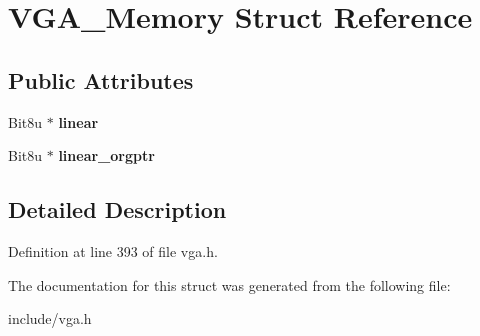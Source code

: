 \hypertarget{structVGA__Memory}{\section{V\-G\-A\-\_\-\-Memory Struct Reference}
\label{structVGA__Memory}
}
\subsection*{Public Attributes}
\begin{DoxyCompactItemize}
\item 
\hypertarget{structVGA__Memory_ad97ba657c0183be121936eeb11436171}{Bit8u $\ast$ {\bfseries linear}}\label{structVGA__Memory_ad97ba657c0183be121936eeb11436171}

\item 
\hypertarget{structVGA__Memory_a8b4dbdb74bb5fe961f686c16cae8a11c}{Bit8u $\ast$ {\bfseries linear\-\_\-orgptr}}\label{structVGA__Memory_a8b4dbdb74bb5fe961f686c16cae8a11c}

\end{DoxyCompactItemize}


\subsection{Detailed Description}


Definition at line 393 of file vga.\-h.



The documentation for this struct was generated from the following file\-:\begin{DoxyCompactItemize}
\item 
include/vga.\-h\end{DoxyCompactItemize}
